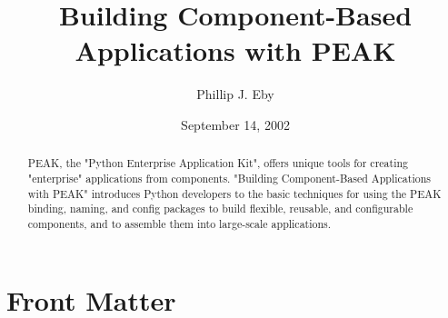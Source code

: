 \documentclass{manual}
\title{Building Component-Based Applications with PEAK}
\author{Phillip J. Eby}
\date{September 14, 2002}       %
\begin{document}
\maketitle

\ifhtml
\chapter*{Front Matter\label{front}}
\fi

%

\begin{abstract}

\noindent

PEAK, the "Python Enterprise Application Kit", offers unique tools for
creating "enterprise" applications from components.  "Building
Component-Based Applications with PEAK" introduces Python developers to
the basic techniques for using the PEAK binding, naming, and config
packages to build flexible, reusable, and configurable components, and
to assemble them into large-scale applications.

\end{abstract}

\tableofcontents





%

%












%
%
%
\renewcommand{\indexname}{Module Index}

\renewcommand{\indexname}{Index}
\end{document}
